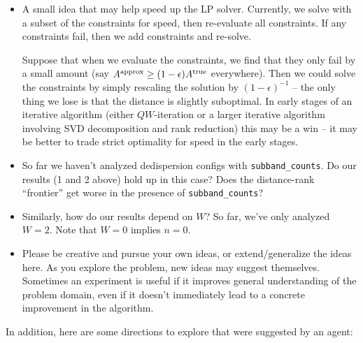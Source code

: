 \documentclass{article}
\numberwithin{equation}{section}   %
\begin{document}
\begin{itemize}
 More generally, if you have any other ``natural'' ideas for generating a $W$-matrix
 (even if there is no obvious way to generate $Q$ beyond solving an LP), this could
 be interesting to investigate.

\item A small idea that may help speed up the LP solver.
 Currently, we solve with a subset of the constraints for speed, then re-evaluate
 all constraints. If any constraints fail, then we add constraints and re-solve.

 Suppose that when we evaluate the constraints, we find that they only fail by
 a small amount (say $A^{\rm approx} \ge (1-\epsilon) A^{\rm true}$ everywhere).
 Then we could solve the constraints by simply rescaling the solution by $(1-\epsilon)^{-1}$ --
 the only thing we lose is that the distance is slightly suboptimal.
 In early stages of an iterative algorithm (either $QW$-iteration or a larger iterative
 algorithm involving SVD decomposition and rank reduction) this may be a win -- it may
 be better to trade strict optimality for speed in the early stages.

\item So far we haven't analyzed dedispersion configs with \verb|subband_counts|.
Do our results (1 and 2 above) hold up in this case?
Does the distance-rank ``frontier'' get worse in the presence of \verb|subband_counts|?

\item Similarly, how do our results depend on $W$?
So far, we've only analyzed $W=2$.
Note that $W=0$ implies $n=0$.

\item Please be creative and pursue your own ideas, or extend/generalize the ideas here.
 As you explore the problem, new ideas may suggest themselves.
 Sometimes an experiment is useful if it improves general understanding of the problem domain,
 even if it doesn't immediately lead to a concrete improvement in the algorithm.

\end{itemize}

\par\noindent
In addition, here are some directions to explore that were suggested by an agent:
\end{document}
